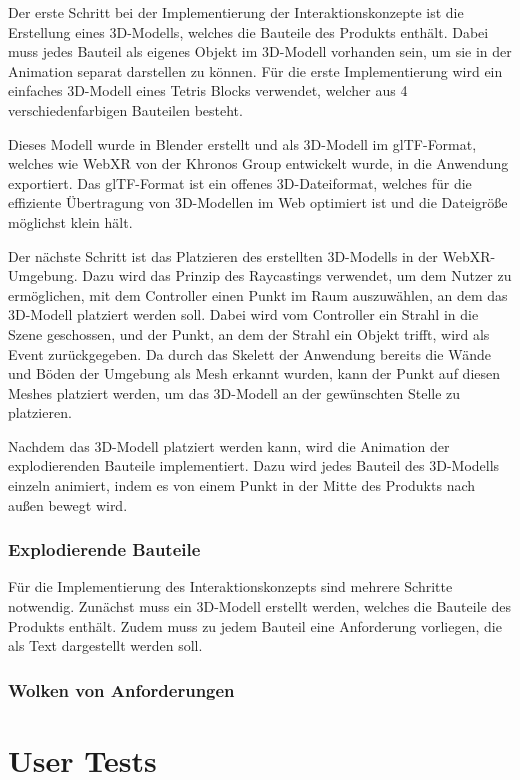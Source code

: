 Der erste Schritt bei der Implementierung der Interaktionskonzepte ist die Erstellung eines 3D-Modells, welches die Bauteile des Produkts enthält.
Dabei muss jedes Bauteil als eigenes Objekt im 3D-Modell vorhanden sein, um sie in der Animation separat darstellen zu können.
Für die erste Implementierung wird ein einfaches 3D-Modell eines Tetris Blocks verwendet, welcher aus 4 verschiedenfarbigen Bauteilen besteht.

Dieses Modell wurde in Blender erstellt und als 3D-Modell im glTF-Format, welches wie WebXR von der Khronos Group entwickelt wurde, in die Anwendung exportiert.
Das glTF-Format ist ein offenes 3D-Dateiformat, welches für die effiziente Übertragung von 3D-Modellen im Web optimiert ist und die Dateigröße möglichst klein hält.

Der nächste Schritt ist das Platzieren des erstellten 3D-Modells in der WebXR-Umgebung.
Dazu wird das Prinzip des Raycastings verwendet, um dem Nutzer zu ermöglichen, mit dem Controller einen Punkt im Raum auszuwählen, an dem das 3D-Modell platziert werden soll.
Dabei wird vom Controller ein Strahl in die Szene geschossen, und der Punkt, an dem der Strahl ein Objekt trifft, wird als Event zurückgegeben.
Da durch das Skelett der Anwendung bereits die Wände und Böden der Umgebung als Mesh erkannt wurden, kann der Punkt auf diesen Meshes platziert werden, um das 3D-Modell an der gewünschten Stelle zu platzieren.

Nachdem das 3D-Modell platziert werden kann, wird die Animation der explodierenden Bauteile implementiert.
Dazu wird jedes Bauteil des 3D-Modells einzeln animiert, indem es von einem Punkt in der Mitte des Produkts nach außen bewegt wird.

\subsubsection{Explodierende Bauteile}

Für die Implementierung des Interaktionskonzepts sind mehrere Schritte notwendig.
Zunächst muss ein 3D-Modell erstellt werden, welches die Bauteile des Produkts enthält.
Zudem muss zu jedem Bauteil eine Anforderung vorliegen, die als Text dargestellt werden soll.


\subsubsection{Wolken von Anforderungen}

\section{User Tests}